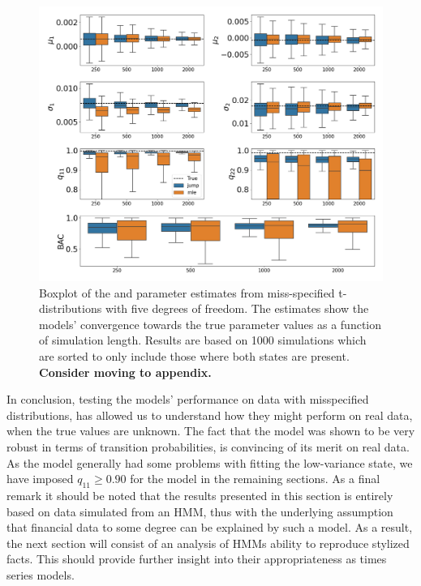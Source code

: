 \begin{figure}[H] 
    \centering
    \includegraphics[width=1\textwidth]{analysis/model_convergence/images/simulation_t_box_2states.png}
    
    
    
    \caption[Boxplot of the \mle and \jump parameter estimates from miss-specified t-distributions with five degrees of freedom. Sorted version]{Boxplot of the \mle and \jump parameter estimates from miss-specified t-distributions with five degrees of freedom. The estimates show the models' convergence towards the true parameter values as a function of simulation length. Results are based on 1000 simulations which are sorted to only include those where both states are present. \textbf{Consider moving to appendix.}} 
    \label{fig:jump_t_box_2states}
\end{figure}

In conclusion, testing the models' performance on data with misspecified distributions, has allowed us to understand how they might perform on real data, when the true values are unknown. The fact that the \jump model was shown to be very robust in terms of transition probabilities, is convincing of its merit on real data. As the \mle model generally had some problems with fitting the low-variance state, we have imposed $q_{11}\geq 0.90$ for the model in the remaining sections. As a final remark it should be noted that the results presented in this section is entirely based on data simulated from an HMM, thus with the underlying assumption that financial data to some degree can be explained by such a model. As a result, the next section will consist of an analysis of HMMs ability to reproduce stylized facts. This should provide further insight into their appropriateness as times series models.